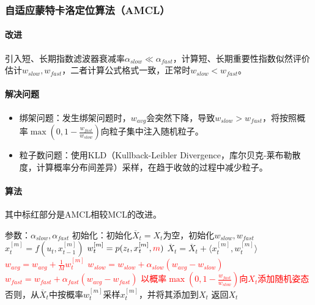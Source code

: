 \documentclass[
12pt, %
a4paper, 
oneside, %
headinclude,footinclude, %
]{scrartcl}
\begin{document}
\subsubsection[自适应蒙特卡洛定位算法]{自适应蒙特卡洛定位算法（AMCL）}
\paragraph{改进}
引入短、长期指数滤波器衰减率$ \alpha_{slow} \ll \alpha_{fast} $，计算短、长期重要性指数似然评价估计$ w_{slow}, w_{fast} $，二者计算公式格式一致，正常时$ w_{slow} < w_{fast} $。
\paragraph{解决问题}
\begin{itemize}
\item 绑架问题：发生绑架问题时，$ w_{avg} $会突然下降，导致$ w_{slow} > w_{fast} $，将按照概率$ \max(0, 1 - \frac{w_{fast}}{w_{slow}}) $向粒子集中注入随机粒子。
\item 粒子数问题：使用KLD（Kullback-Leibler Divergence，库尔贝克-莱布勒散度，计算概率分布间差异）采样，在趋于收敛的过程中减少粒子。
\end{itemize}
\paragraph{算法}
其中标红部分是AMCL相较MCL的改进。
\begin{myalgorithm}[AMCL]
\State 参数：$ \alpha_{slow}, \alpha_{fast} $
\State 初始化：初始化$ \overline{X}_t = X_t $为空，初始化$ w_{slow}, w_{fast} $
\State $ x_t^{[m]} = f(u_t, x_{t - 1}^{[m]}) $
\State $ w_t^{[m]} = p(z_t, x_t^{[m]}, \textcolor{red}{m}) $
\State $ \overline{X}_t = \overline{X}_t + \langle x_t^{[m]}, w_t^{[m]} \rangle $
\State \textcolor{red}{$ w_{avg} = w_{avg} + \frac{1}{M} w_t^{[m]} $} 
\EndFor
\State \textcolor{red}{$ w_{slow} = w_{slow} + \alpha_{slow}(w_{avg} - w_{slow}) $} 
\State \textcolor{red}{$ w_{fast} = w_{fast} + \alpha_{fast}(w_{avg} - w_{fast}) $} 
\State \textcolor{red}{以概率$ \max(0, 1 - \frac{w_{fast}}{w_{slow}}) $向$ X_t $添加随机姿态} 
\State 否则，从$ \overline{X}_t $中按概率$ w_t^{[m]} $采样$ x_t^{[m]} $，并将其添加到$ X_t $ 
\EndFor
\State 返回$ X_t $
\end{myalgorithm}
\end{document}
